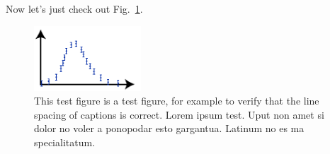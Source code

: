 \documentclass[10pt,a4paper,aps,reprint,notitlepage]{revtex4-1}
\begin{document}
Now let's just check out Fig.~\ref{fig:test}.
\begin{figure}
  \centering
  \includegraphics[width=4cm]{testfigure}
  \caption{This test figure is a test figure, for example to verify that the line spacing
    of captions is correct. Lorem ipsum test.  Uput non amet si dolor no voler a ponopodar
    esto gargantua.  Latinum no es ma specialitatum. }
  \label{fig:test}
\end{figure}





\end{document}
